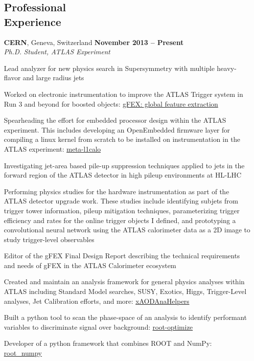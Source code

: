 \documentclass[margin,line]{resume}
\let\origsection\section%
\let\section\subsection%
\let\section\origsection%
\begin{document}
\begin{resume}
\section{\mysidestyle Professional\\Experience}

\textbf{CERN}, Geneva, Switzerland \hfill \textbf{November 2013 -- Present}\\
\textsl{Ph.D. Student, ATLAS Experiment}
\begin{list2}
\item Lead analyzer for new physics search in Supersymmetry with multiple heavy-flavor and large radius jets \cite{SUSY-2016-10, SUSY-2015-10, ATLAS-CONF-2017-021, ATLAS-CONF-2016-052, ATLAS-CONF-2015-067}
\item Worked on electronic instrumentation to improve the ATLAS Trigger system in Run 3 and beyond for boosted objects: \href{https://gfex.cern.ch/}{gFEX: global feature extraction} \cite{Tang:2104248, DPF2017gFEX}
  \item Spearheading the effort for embedded processor design within the ATLAS experiment. This includes developing an OpenEmbedded firmware layer for compiling a linux kernel from scratch to be installed on instrumentation in the ATLAS experiment: \href{https://github.com/kratsg/meta-l1calo}{meta-l1calo}
  \item Investigating jet-area based pile-up suppression techniques applied to jets in the forward region of the ATLAS detector in high pileup environments at HL-LHC \cite{HFSF2017}
  \item Performing physics studies for the hardware instrumentation as part of the ATLAS detector upgrade work. These studies include identifying subjets from trigger tower information, pileup mitigation techniques, parameterizing trigger efficiency and rates for the online trigger objects I defined, and prototyping a convolutional neural network using the ATLAS calorimeter data as a 2D image to study trigger-level observables \cite{DPF2017gFEX}
  \item Editor of the gFEX Final Design Report describing the technical requirements and needs of gFEX in the ATLAS Calorimeter ecosystem \cite{Begel:2233958}
  \item Created and maintain an analysis framework for general physics analyses within ATLAS including Standard Model searches, SUSY, Exotics, Higgs, Trigger-Level analyses, Jet Calibration efforts, and more: \href{https://xaodanahelpers.readthedocs.io/en/master/}{xAODAnaHelpers} \cite{giordon_stark_2015_839037}
  \item Built a python tool to scan the phase-space of an analysis to identify performant variables to discriminate signal over background: \href{https://github.com/kratsg/Optimization}{root-optimize}
  \item Developer of a python framework that combines ROOT and NumPy: \href{http://scikit-hep.org/root_numpy/}{root\_numpy} \cite{Noel_Dawe_2017}
\end{list2}


\end{resume}
\end{document}
